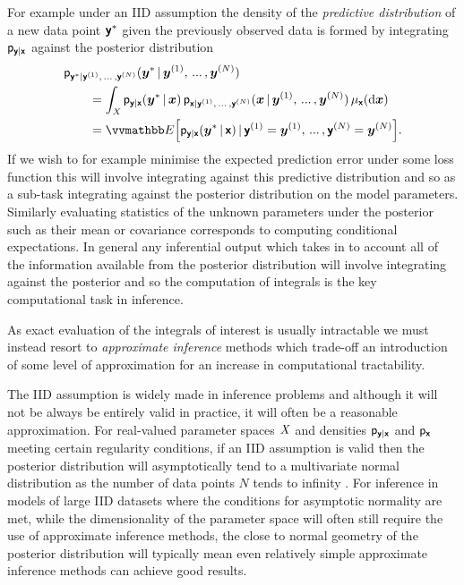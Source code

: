 For example under an \ac{IID} assumption the density of the \emph{predictive distribution} of a new data point $\boldsymbol{\mathsf{y}}^*$ given the previously observed data is formed by integrating $\mathsf{p}_{\boldsymbol{\mathsf{y}}|\boldsymbol{\mathsf{x}}}$ against the posterior distribution
\begin{equation}\label{eq:iid-predictive-distribution}
\begin{split}
  &\pden{\rvct{y}^*|\rvct{y}^{(1)},\,...\,,\rvct{y}^{(N)}}(\vct{y}^* \gvn \vct{y}^{(1)},\,...\,,\vct{y}^{(N)}) \\
  &\qquad = 
  \int_{\set{X}} 
    \pden{\rvct{y}|\rvct{x}}(\vct{y}^*\gvn\vct{x})\,
    \pden{\rvct{x}|\rvct{y}^{(1)},\,...\,,\rvct{y}^{(N)}}(\vct{x} \gvn \vct{y}^{(1)},\,...\,,\vct{y}^{(N)})
  \,\mu_{\rvct{x}}(\dr \vct{x})
  \\
  & \qquad =
  \expc{\pden{\rvct{y}|\rvct{x}}(\vct{y}^*\gvn\rvct{x}) \gvn \rvct{y}^{(1)} = \vct{y}^{(1)},\,...\,,\rvct{y}^{(N)} = \vct{y}^{(N)}}.
\end{split}
\end{equation}
If we wish to for example minimise the expected prediction error under some loss function this will involve integrating against this predictive distribution and so as a sub-task integrating against the posterior distribution on the model parameters. Similarly evaluating statistics of the unknown parameters under the posterior such as their mean or covariance corresponds to computing conditional expectations. In general any inferential output which takes in to account all of the information available from the posterior distribution will involve integrating against the posterior and so the computation of integrals is the key computational task in inference.

As exact evaluation of the integrals of interest is usually intractable we must instead resort to \emph{approximate inference} methods which trade-off an introduction of some level of approximation for an increase in computational tractability. %

The \ac{IID} assumption is widely made in inference problems and although it will not be always be entirely valid in practice, it will often be a reasonable approximation. For real-valued parameter spaces $\mathit{X}$ and densities $\mathsf{p}_{\boldsymbol{\mathsf{y}}|\boldsymbol{\mathsf{x}}}$ and $\mathsf{p}_{\boldsymbol{\mathsf{x}}}$ meeting certain regularity conditions, if an \ac{IID} assumption is valid then the posterior distribution will asymptotically tend to a multivariate normal distribution as the number of data points $N$ tends to infinity \citep{hartigan1983bayes}. For inference in models of large \ac{IID} datasets where the conditions for asymptotic normality are met, while the dimensionality of the parameter space will often still require the use of approximate inference methods, the close to normal geometry of the posterior distribution will typically mean even relatively simple approximate inference methods can achieve good results. %

